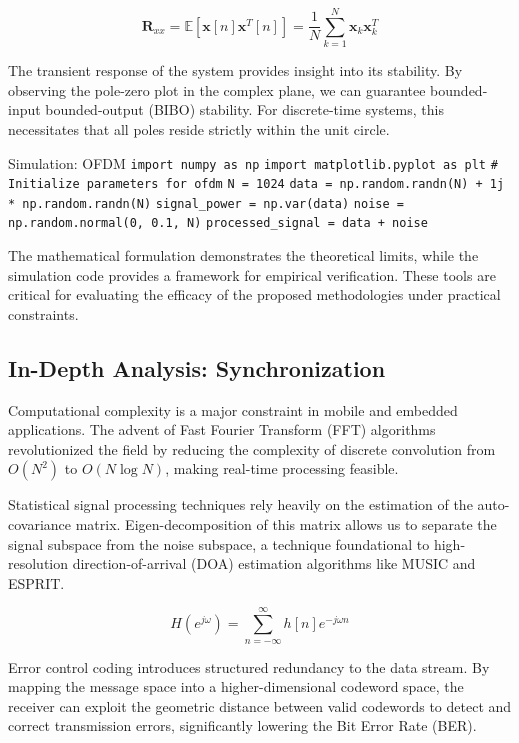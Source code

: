 \begin{equation}
    \mathbf{R}_{xx} = \mathbb{E}[\mathbf{x}[n]\mathbf{x}^T[n]] = \frac{1}{N} \sum_{k=1}^{N} \mathbf{x}_k \mathbf{x}_k^T
\end{equation}

The transient response of the system provides insight into its stability. By observing the pole-zero plot in the complex plane, we can guarantee bounded-input bounded-output (BIBO) stability. For discrete-time systems, this necessitates that all poles reside strictly within the unit circle.

\begin{pythonbox}{Simulation: OFDM}
\texttt{import numpy as np}
\texttt{import matplotlib.pyplot as plt}
\texttt{}
\texttt{\# Initialize parameters for ofdm}
\texttt{N = 1024}
\texttt{data = np.random.randn(N) + 1j * np.random.randn(N)}
\texttt{signal\_power = np.var(data)}
\texttt{noise = np.random.normal(0, 0.1, N)}
\texttt{processed\_signal = data + noise}
\end{pythonbox}

\vspace{0.5cm}
The mathematical formulation demonstrates the theoretical limits, while the simulation code provides a framework for empirical verification. These tools are critical for evaluating the efficacy of the proposed methodologies under practical constraints.


\subsection{In-Depth Analysis: Synchronization}
Computational complexity is a major constraint in mobile and embedded applications. The advent of Fast Fourier Transform (FFT) algorithms revolutionized the field by reducing the complexity of discrete convolution from $O(N^2)$ to $O(N \log N)$, making real-time processing feasible.

Statistical signal processing techniques rely heavily on the estimation of the auto-covariance matrix. Eigen-decomposition of this matrix allows us to separate the signal subspace from the noise subspace, a technique foundational to high-resolution direction-of-arrival (DOA) estimation algorithms like MUSIC and ESPRIT.

\begin{equation}
    H(e^{j\omega}) = \sum_{n=-\infty}^{\infty} h[n] e^{-j\omega n}
\end{equation}

Error control coding introduces structured redundancy to the data stream. By mapping the message space into a higher-dimensional codeword space, the receiver can exploit the geometric distance between valid codewords to detect and correct transmission errors, significantly lowering the Bit Error Rate (BER).


